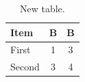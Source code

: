 \begin{table}[htbp]
  \centering
  \begin{tabular}{lcc}
    \toprule
    Item & B& B \\
    \midrule
    First & 1 & 3 \\
    Second & 3 & 4 \\
    \bottomrule
  \end{tabular}
  \caption{New table.}
  \label{tab:new}
\end{table}